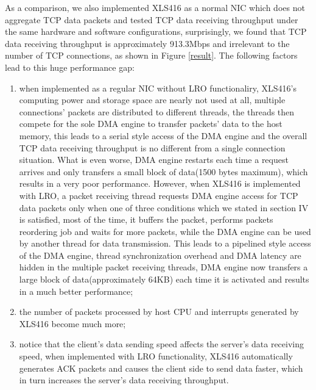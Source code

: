 \documentclass[conference]{IEEEtran}
\begin{document}
As a comparison, we also implemented XLS416 as a normal NIC which does not aggregate TCP data packets and tested TCP data receiving throughput under the same hardware and software configurations, surprisingly, we found that TCP data receiving throughput is approximately 913.3Mbps and irrelevant to the number of TCP connections, as shown in Figure \ref{result}. The following factors lead to this huge performance gap:
\begin{enumerate}
\item when implemented as a regular NIC without LRO functionaliry, XLS416's computing power and storage space are nearly not used at all, multiple connections' packets are distributed to different threads, the threads then compete for the sole DMA engine to transfer packets' data to the host memory, this leads to a serial style access of the DMA engine and the overall TCP data receiving throughput is no different from a single connection situation. What is even worse, DMA engine restarts each time a request arrives and only transfers a small block of data(1500 bytes maximum), which results in a very poor performance. However, when XLS416 is implemented with LRO, a packet receiving thread requests DMA engine access for TCP data packets only when one of three conditions which we stated in section IV is satisfied, most of the time, it buffers the packet, performs packets reordering job and waits for more packets, while the DMA engine can be used by another thread for data transmission. This leads to a pipelined style access of the DMA engine, thread synchronization overhead and DMA latency are hidden in the multiple packet receiving threads, DMA engine now transfers a large block of data(approximately 64KB) each time it is activated and results in a much better performance;
\item the number of packets processed by host CPU and interrupts generated by XLS416 become much more;
\item notice that the client's data sending speed affects the server's data receiving speed, when implemented with LRO functionality, XLS416 automatically generates ACK packets and causes the client side to send data faster, which in turn increases the server's data receiving throughput.
\end{enumerate}
\end{document}
